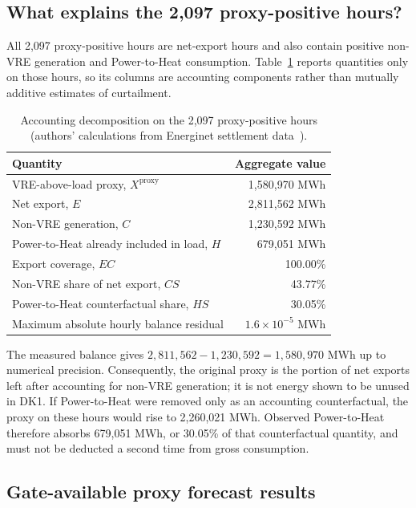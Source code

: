 \documentclass[11pt,a4paper]{article}
\begin{document}
\subsection{What explains the 2,097 proxy-positive hours?}

All 2,097 proxy-positive hours are net-export hours and also contain positive
non-VRE generation and Power-to-Heat consumption.  Table~\ref{tab:proxy-decomposition}
reports quantities only on those hours, so its columns are accounting
components rather than mutually additive estimates of curtailment.

\begin{table}[htbp]
  \centering
  \caption{Accounting decomposition on the 2,097 proxy-positive hours
  (authors' calculations from Energinet settlement data~\cite{energineteds}).}
  \begin{tabular}{lr}
    \toprule
    Quantity & Aggregate value \\
    \midrule
    VRE-above-load proxy, $X^{\mathrm{proxy}}$ & 1,580,970 MWh \\
    Net export, $E$ & 2,811,562 MWh \\
    Non-VRE generation, $C$ & 1,230,592 MWh \\
    Power-to-Heat already included in load, $H$ & 679,051 MWh \\
    Export coverage, $EC$ & 100.00\% \\
    Non-VRE share of net export, $CS$ & 43.77\% \\
    Power-to-Heat counterfactual share, $HS$ & 30.05\% \\
    Maximum absolute hourly balance residual & $1.6\times10^{-5}$ MWh \\
    \bottomrule
  \end{tabular}
  \label{tab:proxy-decomposition}
\end{table}

The measured balance gives
$2{,}811{,}562-1{,}230{,}592=1{,}580{,}970$ MWh up to numerical precision.
Consequently, the original proxy is the portion of net exports left after
accounting for non-VRE generation; it is not energy shown to be unused in DK1.
If Power-to-Heat were removed only as an accounting counterfactual, the proxy
on these hours would rise to 2,260,021 MWh.  Observed Power-to-Heat therefore
absorbs 679,051 MWh, or 30.05\% of that counterfactual quantity, and must not be
deducted a second time from gross consumption.

\subsection{Gate-available proxy forecast results}
\end{document}
